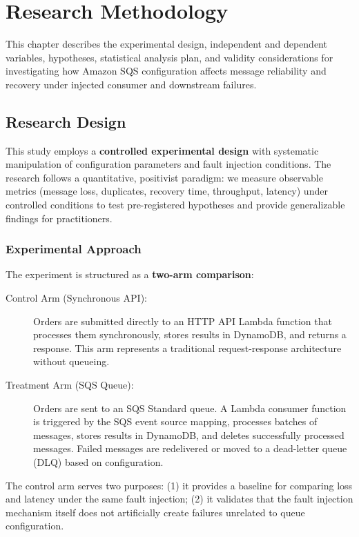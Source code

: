 \chapter{Research Methodology}

This chapter describes the experimental design, independent and dependent variables, hypotheses, statistical analysis plan, and validity considerations for investigating how Amazon SQS configuration affects message reliability and recovery under injected consumer and downstream failures.

\section{Research Design}

This study employs a \textbf{controlled experimental design} with systematic manipulation of configuration parameters and fault injection conditions. The research follows a quantitative, positivist paradigm: we measure observable metrics (message loss, duplicates, recovery time, throughput, latency) under controlled conditions to test pre-registered hypotheses and provide generalizable findings for practitioners.

\subsection{Experimental Approach}

The experiment is structured as a \textbf{two-arm comparison}:

\begin{description}
    \item[Control Arm (Synchronous API):] Orders are submitted directly to an HTTP API Lambda function that processes them synchronously, stores results in DynamoDB, and returns a response. This arm represents a traditional request-response architecture without queueing.
    
    \item[Treatment Arm (SQS Queue):] Orders are sent to an SQS Standard queue. A Lambda consumer function is triggered by the SQS event source mapping, processes batches of messages, stores results in DynamoDB, and deletes successfully processed messages. Failed messages are redelivered or moved to a dead-letter queue (DLQ) based on configuration.
\end{description}

The control arm serves two purposes: (1) it provides a baseline for comparing loss and latency under the same fault injection; (2) it validates that the fault injection mechanism itself does not artificially create failures unrelated to queue configuration.

